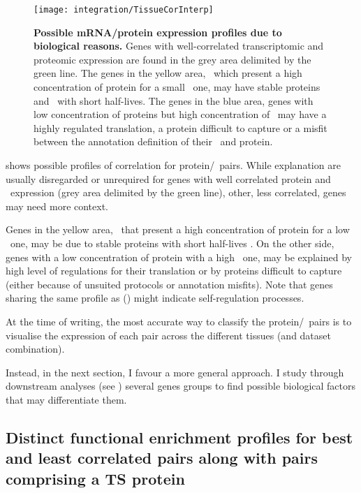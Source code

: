\begin{figure}[!htb]
    \texttt{[image: integration/TissueCorInterp]}\centering
    \vspace{-3mm}
    \caption[Possible mRNA/protein expression profiles
    due to biological reasons.]{\label{fig:CorImprovable}%
    \textbf{Possible mRNA/protein expression profiles due to biological reasons.}
    Genes with well-correlated transcriptomic and proteomic expression
    are found in the grey area delimited by the green line.
    The genes in the yellow area,
    \ie\ which present a high concentration of protein for a small \mRNA\ one,
    may have stable proteins and \mRNAs\ with short half-lives.
    The genes in the blue area,
    genes with low concentration of proteins but high concentration of \mRNAs\
    may have a highly regulated translation,
    a protein difficult to capture
    or a misfit between the annotation definition of their \mRNA\ and protein.
    }
\end{figure}


 shows possible profiles of correlation for
protein/\mRNA\ pairs.
While explanation are usually disregarded or unrequired for genes
with well correlated protein and \mRNA\ expression
(grey area delimited by the green line),
other, less correlated, genes may need more context.

Genes in the yellow area,
\ie\ that present a high concentration of protein for a low \mRNA\ one,
may be due to stable proteins with short half-lives \mRNAs{}.
On the other side,
genes with a low concentration of protein with a high \mRNA\ one,
may be explained by high level of regulations for their translation
or by proteins difficult to capture
(either because of unsuited protocols or annotation misfits).
Note that genes sharing the same profile as  ()
might indicate self-regulation processes.

At the time of writing,
the most accurate way to classify the protein/\mRNA\ pairs
is to visualise the expression of each pair across the different tissues
(and dataset combination).

Instead, in the next section, I favour a more general approach.
I study through downstream analyses (see )
several genes groups
to find possible biological factors that may differentiate them.

\subsection{Distinct functional enrichment profiles
for best and least correlated pairs
along with pairs comprising a TS protein}


